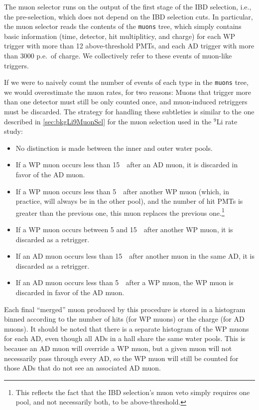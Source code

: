 \documentclass[../thesis.tex]{subfiles}
\begin{document}
The muon selector runs on the output of the first stage of the IBD selection, i.e., the pre-selection, which does not depend on the IBD selection cuts. In particular, the muon selector reads the contents of the \texttt{muons} tree, which simply contains basic information (time, detector, hit multipliticy, and charge) for each WP trigger with more than 12 above-threshold PMTs, and each AD trigger with more than 3000 p.e.\ of charge. We collectively refer to these events of muon-like triggers.

If we were to naively count the number of events of each type in the \texttt{muons} tree, we would overestimate the muon rates, for two reasons: Muons that trigger more than one detector must still be only counted once, and muon-induced retriggers must be discarded. The strategy for handling these subtleties is similar to the one described in \autoref{sec:bkgLi9MuonSel} for the muon selection used in the $^9$Li rate study:

\begin{itemize}
\item No distinction is made between the inner and outer water pools.
\item If a WP muon occurs less than 15~\us\ after an AD muon, it is discarded in favor of the AD muon.
\item If a WP muon occurs less than 5~\us\ after another WP muon (which, in practice, will always be in the other pool), and the number of hit PMTs is greater than the previous one, this muon replaces the previous one.\footnote{This reflects the fact that the IBD selection's muon veto simply requires one pool, and not necessarily both, to be above-threshold.}
\item If a WP muon occurs between 5 and 15~\us\ after another WP muon, it is discarded as a retrigger.
\item If an AD muon occurs less than 15~\us\ after another muon in the same AD, it is discarded as a retrigger.
\item If an AD muon occurs less than 5~\us\ after a WP muon, the WP muon is discarded in favor of the AD muon.
\end{itemize}

Each final ``merged'' muon produced by this procedure is stored in a histogram binned according to the number of hits (for WP muons) or the charge (for AD muons). It should be noted that there is a separate histogram of the WP muons for each AD, even though all ADs in a hall share the same water pools. This is because an AD muon will override a WP muon, but a given muon will not necessarily pass through every AD, so the WP muon will still be counted for those ADs that do not see an associated AD muon.
\end{document}
